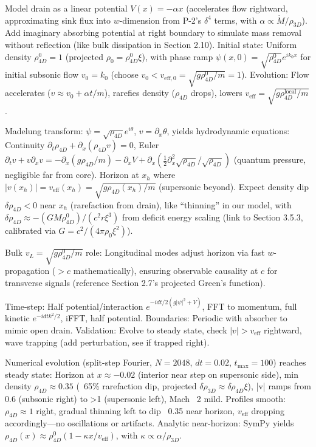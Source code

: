 \documentclass{article}
\begin{document}
Model drain as a linear potential $V(x) = -\alpha x$ (accelerates flow rightward, approximating sink flux into $w$-dimension from P-2's $\delta^4$ terms, with $\alpha \propto \dot{M} / \rho_{3D}$). Add imaginary absorbing potential at right boundary to simulate mass removal without reflection (like bulk dissipation in Section 2.10). Initial state: Uniform density $\rho_{4D}^0 = 1$ (projected $\rho_0 = \rho_{4D}^0 \xi$), with phase ramp $\psi(x,0) = \sqrt{\rho_{4D}^0} e^{i k_0 x}$ for initial subsonic flow $v_0 = k_0$ (choose $v_0 < v_{\text{eff},0} = \sqrt{g \rho_{4D}^0 / m} = 1$). Evolution: Flow accelerates ($v \approx v_0 + \alpha t / m$), rarefies density ($\rho_{4D}$ drops), lowers $v_{\text{eff}} = \sqrt{g \rho_{4D}^{\text{local}} / m}$.

Madelung transform: $\psi = \sqrt{\rho_{4D}} e^{i \theta}$, $v = \partial_x \theta$, yields hydrodynamic equations: Continuity $\partial_t \rho_{4D} + \partial_x (\rho_{4D} v) = 0$, Euler $\partial_t v + v \partial_x v = -\partial_x (g \rho_{4D} / m) - \partial_x V + \partial_x (\frac{1}{2} \partial_x^2 \sqrt{\rho_{4D}} / \sqrt{\rho_{4D}})$ (quantum pressure, negligible far from core). Horizon at $x_h$ where $|v(x_h)| = v_{\text{eff}}(x_h) = \sqrt{g \rho_{4D}(x_h) / m}$ (supersonic beyond). Expect density dip $\delta \rho_{4D} < 0$ near $x_h$ (rarefaction from drain), like ``thinning'' in our model, with $\delta \rho_{4D} \approx - (G M \rho_{4D}^0) / (c^2 r \xi^3)$ from deficit energy scaling (link to Section 3.5.3, calibrated via $G = c^2 / (4\pi \rho_0 \xi^2)$).

Bulk $v_L = \sqrt{g \rho_{4D}^0 / m}$ role: Longitudinal modes adjust horizon via fast $w$-propagation ($> c$ mathematically), ensuring observable causality at $c$ for transverse signals (reference Section 2.7's projected Green's function).

Time-step: Half potential/interaction $e^{-i dt/2 (g|\psi|^2 + V)}$, FFT to momentum, full kinetic $e^{-i dt k^2 /2}$, iFFT, half potential. Boundaries: Periodic with absorber to mimic open drain. Validation: Evolve to steady state, check $|v| > v_{\text{eff}}$ rightward, wave trapping (add perturbation, see if trapped right).

Numerical evolution (split-step Fourier, $N=2048$, $dt=0.02$, $t_{\max}=100$) reaches steady state: Horizon at $x \approx -0.02$ (interior near step on supersonic side), min density $\rho_{4D} \approx 0.35$ (~65\% rarefaction dip, projected $\delta \rho_{3D} \approx \delta \rho_{4D} \xi$), |v| ramps from 0.6 (subsonic right) to >1 (supersonic left), Mach ~2 mild. Profiles smooth: $\rho_{4D} \approx 1$ right, gradual thinning left to dip ~0.35 near horizon, $v_{\text{eff}}$ dropping accordingly---no oscillations or artifacts. Analytic near-horizon: SymPy yields $\rho_{4D}(x) \approx \rho_{4D}^0 (1 - \kappa x / v_{\text{eff}})$, with $\kappa \propto \alpha / \rho_{3D}$.
\end{document}
